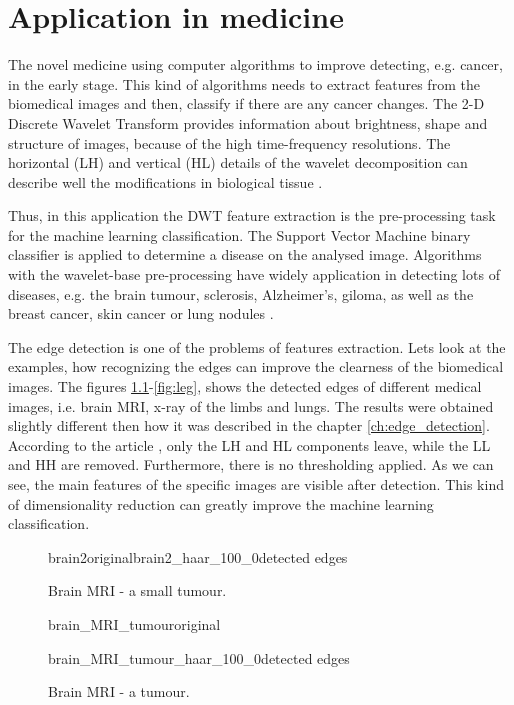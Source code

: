 \chapter{Application in medicine}

The novel medicine using computer algorithms to improve detecting, e.g. cancer, in the early stage.
This kind of algorithms needs to extract features from the biomedical images and then, classify if there are any cancer changes. The 2-D Discrete Wavelet Transform provides information about brightness, shape and structure of images, because of the high time-frequency resolutions. The horizontal (LH) and vertical (HL) details of the wavelet decomposition can describe well the modifications in biological tissue \cite{MRI}. 

Thus, in this application the DWT feature extraction is the pre-processing task for the machine learning classification. The Support Vector Machine binary classifier is applied to determine a disease on the analysed image. Algorithms with the wavelet-base pre-processing have widely application in detecting lots of diseases, e.g. the brain tumour, sclerosis, Alzheimer's, giloma, as well as the breast cancer, skin cancer or lung nodules  \cite{BiomedicalImages}.

The edge detection is one of the problems of features extraction. Lets look at the examples, how recognizing the edges can improve the clearness of the biomedical images. The figures \ref{fig:brain2}-\ref{fig:leg}, shows the detected edges of different medical images, i.e. brain MRI, x-ray of the limbs and lungs. The results were obtained slightly different then how it was described in the chapter \ref{ch:edge_detection}. According to the article \cite{MRI}, only the LH and HL components leave, while the LL and HH are removed. Furthermore, there is no thresholding applied. As we can see, the main features of the specific images are visible after detection. This kind of dimensionality reduction can greatly improve the machine learning classification.

\begin{figure}[h]
	\centering
	\begin{mainsubdiagrams2}{brain2}{original}{brain2_haar_100_0}{detected edges}
	\end{mainsubdiagrams2}
	
	\caption{Brain MRI - a small tumour.}
	\label{fig:brain2}
\end{figure}


\begin{figure}[h]
	\centering
	\begin{subdiagram}{brain_MRI_tumour}{original}
	\end{subdiagram}
	
	\begin{subdiagram}{brain_MRI_tumour_haar_100_0}{detected edges}
	\end{subdiagram}
	
	\caption{Brain MRI - a tumour.}
	\label{fig:brain1}
\end{figure}


